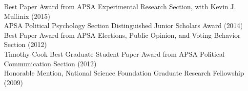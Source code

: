 \documentclass[12pt]{article}
\renewcommand{\section}[1]{\pagebreak[3]%
    \llap{\scshape\smash{\parbox[t]{\marginparwidth}{\raggedright {\color{lg}#1}}}}%
    \vspace{-\baselineskip}\par}
\newcommand{\entry}[1]{\indent {\color{lg}\guillemotright}\hspace{2pt}#1\vspace{.25em}\\}
\begin{document}
\section{Honors\\and\\Awards}
\entry{Best Paper Award from APSA Experimental Research Section, with Kevin J. Mullinix (2015)}
\entry{APSA Political Psychology Section Distinguished Junior Scholars Award (2014)}
\entry{Best Paper Award from APSA Elections, Public Opinion, and Voting Behavior Section (2012)}
\entry{Timothy Cook Best Graduate Student Paper Award from APSA Political Communication Section (2012)}
\entry{Honorable Mention, National Science Foundation Graduate Research Fellowship (2009)}

\end{document}
